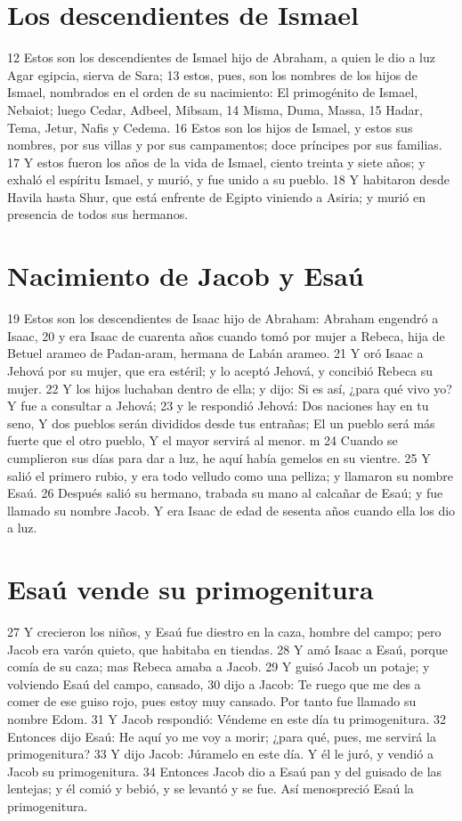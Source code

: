 \section*{Los descendientes de Ismael}

12 Estos son los descendientes de Ismael hijo de Abraham, a quien le dio a luz Agar egipcia, sierva de Sara;
13 estos, pues, son los nombres de los hijos de Ismael, nombrados en el orden de su nacimiento: El primogénito de Ismael, Nebaiot; luego Cedar, Adbeel, Mibsam,
14 Misma, Duma, Massa,
15 Hadar, Tema, Jetur, Nafis y Cedema.
16 Estos son los hijos de Ismael, y estos sus nombres, por sus villas y por sus campamentos; doce príncipes por sus familias.
17 Y estos fueron los años de la vida de Ismael, ciento treinta y siete años; y exhaló el espíritu Ismael, y murió, y fue unido a su pueblo.
18 Y habitaron desde Havila hasta Shur, que está enfrente de Egipto viniendo a Asiria; y murió en presencia de todos sus hermanos.

\section*{Nacimiento de Jacob y Esaú}

19 Estos son los descendientes de Isaac hijo de Abraham: Abraham engendró a Isaac,
20 y era Isaac de cuarenta años cuando tomó por mujer a Rebeca, hija de Betuel arameo de Padan-aram, hermana de Labán arameo.
21 Y oró Isaac a Jehová por su mujer, que era estéril; y lo aceptó Jehová, y concibió Rebeca su mujer.
22 Y los hijos luchaban dentro de ella; y dijo: Si es así, ¿para qué vivo yo? Y fue a consultar a Jehová;
23 y le respondió Jehová:
Dos naciones hay en tu seno,
Y dos pueblos serán divididos desde tus entrañas;
El un pueblo será más fuerte que el otro pueblo,
Y el mayor servirá al menor. m
24 Cuando se cumplieron sus días para dar a luz, he aquí había gemelos en su vientre.
25 Y salió el primero rubio, y era todo velludo como una pelliza; y llamaron su nombre Esaú.
26 Después salió su hermano, trabada su mano al calcañar de Esaú; y fue llamado su nombre Jacob. Y era Isaac de edad de sesenta años cuando ella los dio a luz.

\section*{Esaú vende su primogenitura}

27 Y crecieron los niños, y Esaú fue diestro en la caza, hombre del campo; pero Jacob era varón quieto, que habitaba en tiendas.
28 Y amó Isaac a Esaú, porque comía de su caza; mas Rebeca amaba a Jacob.
29 Y guisó Jacob un potaje; y volviendo Esaú del campo, cansado,
30 dijo a Jacob: Te ruego que me des a comer de ese guiso rojo, pues estoy muy cansado. Por tanto fue llamado su nombre Edom.
31 Y Jacob respondió: Véndeme en este día tu primogenitura.
32 Entonces dijo Esaú: He aquí yo me voy a morir; ¿para qué, pues, me servirá la primogenitura?
33 Y dijo Jacob: Júramelo en este día. Y él le juró, y vendió a Jacob su primogenitura.
34 Entonces Jacob dio a Esaú pan y del guisado de las lentejas; y él comió y bebió, y se levantó y se fue. Así menospreció Esaú la primogenitura.

